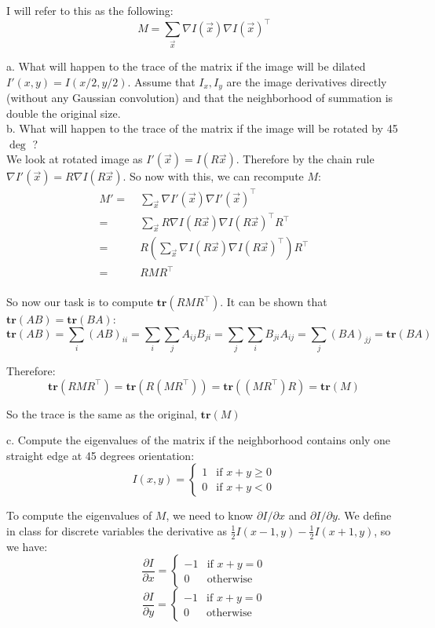 \documentclass[11pt,english]{article}
\begin{document}
\begin{enumerate}
I will refer to this as the following:
\[
    M = \sum_{\vec{x}} \nabla I(\vec{x}) \nabla I(\vec{x})^\top 
\]

a. What will happen to the trace of the matrix if the image will be dilated $I'(x,y) = I(x/2,y/2)$.
Assume that $I_x,I_y$ are the image derivatives directly (without any Gaussian convolution) and that the neighborhood of summation is double the original size. 
\\
b. What will happen to the trace of the matrix if the image will be rotated by 45$\deg$ ?
\\
We look at rotated image as $I'(\vec{x}) = I(R\vec{x})$. Therefore by the chain rule
$\nabla I'(\vec{x}) = R \nabla I(R\vec{x})$. So now with this, we can recompute $M$:
\begin{align*}
    M'
    =&\; \sum_{\vec{x}} \nabla I'(\vec{x}) \nabla I'(\vec{x})^\top \\
    =&\; \sum_{\vec{x}} R\nabla I(R\vec{x}) \nabla I(R\vec{x})^\top R^\top \\ 
    =&\; R \left( \sum_{\vec{x}} \nabla I(R\vec{x}) \nabla I(R\vec{x})^\top \right) R^\top \\
    =&\; R M R^\top \\
\end{align*}

So now our task is to compute $\mathbf{tr}(R M R^\top)$. It can be shown that $\mathbf{tr}(AB) = \mathbf{tr}(BA)$:
\[ \mathbf{tr}(AB) = \sum_i (AB)_{ii} = \sum_i \sum_j A_{ij} B_{ji}
= \sum_j \sum_i B_{ji} A_{ij} = \sum_j (BA)_{jj} = \mathbf{tr}(BA)  \]

Therefore:
\[ \mathbf{tr}(RMR^\top) = \mathbf{tr}(R(MR^\top)) = \mathbf{tr}((MR^\top)R) = \mathbf{tr}(M) \]

So the trace is the same as the original, $\mathbf{tr}(M)$

c. Compute the eigenvalues of the matrix if the neighborhood contains only one straight edge at 45 degrees orientation:
\[
I(x,y) = \left\{
	\begin{array}{ll}
		1  & \mbox{if } x+y \geq 0 \\
		0 & \mbox{if } x+y < 0
	\end{array}
\right.
\]

To compute the eigenvalues of $M$, we need to know $\partial I / \partial x$ and $\partial I / \partial y$.
We define in class for discrete variables the derivative as $\frac{1}{2} I(x-1,y) - \frac{1}{2} I(x+1,y)$,
so we have:
\[ \frac{\partial I}{\partial x} = \left\{
    \begin{array}{ll}
       -1 & \textrm{if } x + y = 0 \\
        0 & \textrm{otherwise}
    \end{array} \right.
\]
\[ \frac{\partial I}{\partial y} = \left\{
    \begin{array}{ll}
       -1 & \textrm{if } x + y = 0 \\
        0 & \textrm{otherwise}
    \end{array} \right.
\]


\end{enumerate}
\end{document}

